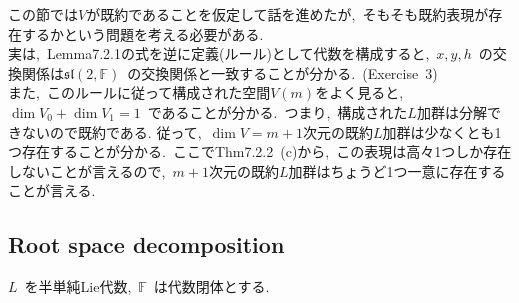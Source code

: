 \documentclass[uplatex,dvipdfmx]{jsarticle}
\begin{document}
この節では$V$が既約であることを仮定して話を進めたが,~そもそも既約表現が存在するかという問題を考える必要がある.\\
実は,~Lemma7.2.1の式を逆に定義(ルール)として代数を構成すると,~$x,y,h$~の交換関係は$\mathfrak{sl}(2,\mathbb{F})$~の交換関係と一致することが分かる.~(Exercise~3)\\
また,~このルールに従って構成された空間$V(m)$をよく見ると,~$\dim V_0 + \dim V_1 = 1$~であることが分かる.~つまり,~構成された$L$加群は分解できないので既約である.
従って,~$\dim V = m+1$次元の既約$L$加群は少なくとも1つ存在することが分かる.~ここでThm7.2.2~(c)から,~この表現は高々1つしか存在しないことが言えるので,~$m+1$次元の既約$L$加群はちょうど1つ一意に存在することが言える.\\
\newpage
\subsection{Root space decomposition}
$L$~を半単純Lie代数,~$\mathbb{F}$~は代数閉体とする.
\end{document}
